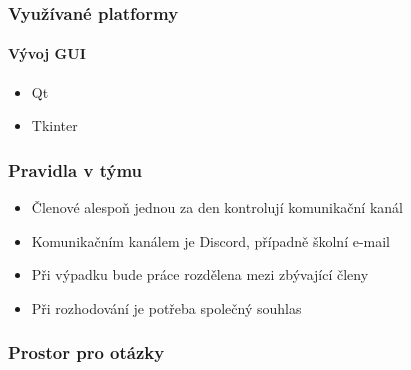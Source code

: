 \documentclass{beamer}
\begin{document}
	\begin{frame}
		\frametitle{Využívané platformy}
		\framesubtitle{Vývoj GUI}
		\begin{itemize}
			\item Qt
			\item Tkinter
		\end{itemize}
	\end{frame}				
			
	\begin{frame}
		\frametitle{Pravidla v týmu}
		\begin{itemize}
			\item Členové alespoň jednou za den kontrolují komunikační kanál
			\item Komunikačním kanálem je Discord, případně školní e-mail
			\item Při výpadku bude práce rozdělena mezi zbývající členy
			\item Při rozhodování je potřeba společný souhlas
		\end{itemize}
	\end{frame}				
			
	\begin{frame}
		\frametitle{Prostor pro otázky}
	\end{frame}
\end{document}
